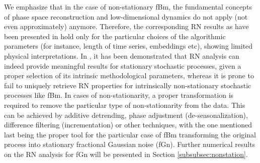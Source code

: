 		We emphasize that in the case of non-stationary fBm, the fundamental concepts of phase space reconstruction and low-dimensional dynamics do not apply (not even approximately) anymore. Therefore, the corresponding RN results as have been presented in \cite{Liu2014} hold only for the particular choices of the algorithmic parameters (for instance, length of time series, embeddings etc), showing limited physical interpretations. In \cite{Zou2015}, it has been demonstrated that RN analysis can indeed provide meaningful results for stationary stochastic processes, given a proper selection of its intrinsic methodological parameters, whereas it is prone to fail to uniquely retrieve RN properties for intrinsically non-stationary stochastic processes like fBm. In cases of non-stationarity, a proper transformation is required to remove the particular type of non-stationarity from the data. This can be achieved by additive detrending, phase adjustment (de-seasonalization), difference filtering (incrementation) or other techniques, with the one mentioned last being the proper tool for the particular case of fBm transforming the original process into stationary fractional Gaussian noise (fGn). Further numerical results on the RN analysis for fGn will be presented in Section \ref{subsubsec:nonstation}.


